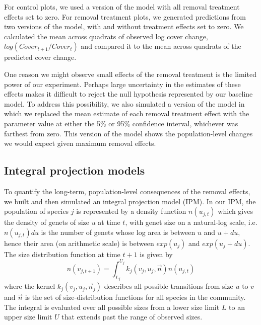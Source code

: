\documentclass[11pt]{article}
\begin{document}
\begin{doublespacing}
For control plots, we used a version of the model with all removal treatment effects set to zero. For removal treatment plots, we generated predictions from two versions of the model, with and without treatment effects set to zero.  We calculated the mean across quadrats of observed log cover change, $log(Cover_{t+1}/Cover_t)$ and compared it to the mean across quadrats of the predicted cover change.

One reason we might observe small effects of the removal treatment is the limited power of our experiment. Perhaps large uncertainty in the estimates of these effects makes it difficult to reject the null hypothesis represented by our baseline model. To address this possibility, we also simulated a version of the model in which we replaced the mean estimate of each removal treatment effect with the parameter value at either the 5\% or 95\% confidence interval, whichever was farthest from zero. This version of the model shows the population-level changes we would expect given maximum removal effects.

\subsection*{Integral projection models}

To quantify the long-term, population-level consequences of the removal effects, we built and then simulated an integral projection model (IPM). In our IPM, the population of species $j$ is represented by a density function $n(u_{j,t})$ which gives the density of genets of size $u$ at time $t$, with genet size on a natural-log scale, i.e. $n(u_{j,t})du$ is the number of genets whose log area is between $u$ and $u+du$, hence their area 
(on arithmetic scale) is between $exp(u_j)$ and $exp(u_j+du)$. The size distribution function at time $t+1$ is given by
\begin{equation}
n(v_{j,t+1})=\int_{L_j}^{U_j} k_j (v_j,u_j,{\vec{n}})n(u_{j,t})   
\label{eqn:IPM}
\end{equation}
where the kernel $k_j (v_j,u_j,\vec{n}_j)$ describes all possible transitions from size $u$ to $v$ and $\vec{n}$ 
is the set of size-distribution functions for all species in the community. The integral is evaluated over all possible sizes from a 
lower size limit $L$ to an upper size limit $U$ that extends past the range of observed sizes.   


\end{doublespacing}
\end{document}
